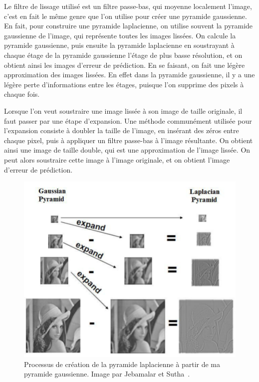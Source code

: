 Le filtre de lissage utilisé est un filtre passe-bas, qui moyenne localement l'image, c'est en fait le même genre que l'on utilise pour créer une pyramide gaussienne. En fait, pour construire une pyramide laplacienne, on utilise souvent la pyramide gaussienne de l'image, qui représente toutes les images lissées. On calcule la pyramide gaussienne, puis ensuite la pyramide laplacienne en soustrayant à chaque étage de la pyramide gaussienne l'étage de plus basse résolution, et on obtient ainsi les images d'erreur de prédiction. En se faisant, on fait une légère approximation des images lissées. En effet dans la pyramide gaussienne, il y a une légère perte d'informations entre les étages, puisque l'on supprime des pixels à chaque fois.

Lorsque l'on veut soustraire une image lissée à son image de taille originale, il faut passer par une étape d'expansion. Une méthode communément utilisée pour l'expansion consiste à doubler la taille de l'image, en insérant des zéros entre chaque pixel, puis à appliquer un filtre passe-bas à l'image résultante. On obtient ainsi une image de taille double, qui est une approximation de l'image lissée. On peut alors soustraire cette image à l'image originale, et on obtient l'image d'erreur de prédiction.

\begin{figure}
    \centering
    \includegraphics[width=.75\textwidth]{contenu/resources/images/gauss_laplace_pyramid}
    \caption[Relation entre pyramide gaussienne et laplacienne]{Processus de création de la pyramide laplacienne à partir de ma pyramide gaussienne. Image par Jebamalar et Sutha~\cite{jebamalar_design_2014}.}
    \label{fig:gauss-laplace-pyramid}
\end{figure}

